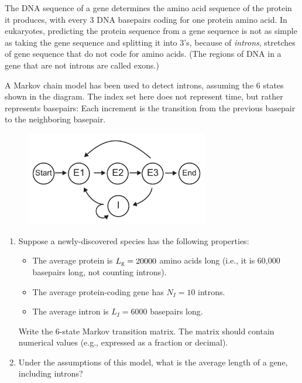 \documentclass[12pt,letterpaper]{article}
\begin{document}


The DNA sequence of a gene determines the amino acid sequence of the protein it produces, with every 3 DNA basepairs coding for one protein amino acid. In eukaryotes, predicting the protein sequence from a gene sequence is not as simple as taking the gene sequence and splitting it into 3's, because of \emph{introns}, stretches of gene sequence that do not code for amino acids. (The regions of DNA in a gene that are not introns are called exons.)

A Markov chain model has been used to detect introns, assuming the 6 states shown in the diagram. The index set here does not represent time, but rather represents basepairs: Each increment is the transition from the previous basepair to the neighboring basepair.
\begin{figure}[h!]
\centering\includegraphics[width=8cm]{figP21}
\end{figure}

\begin{enumerate}[i]
\item Suppose a newly-discovered species has the following properties:
\begin{itemize}
\item The average protein is $L_{\rm g} = 20000$ amino acids long (i.e., it is 60,000 basepairs long, not counting introns).
\item The average protein-coding gene has $N_I=10$ introns.
\item The average intron is $L_I=6000$ basepairs long. 
\end{itemize}
Write the 6-state Markov transition matrix. The matrix should contain numerical values (e.g., expressed as a fraction or decimal). 
\item Under the assumptions of this model, what is the average length of a gene, including introns?
\end{enumerate}

\end{document}

